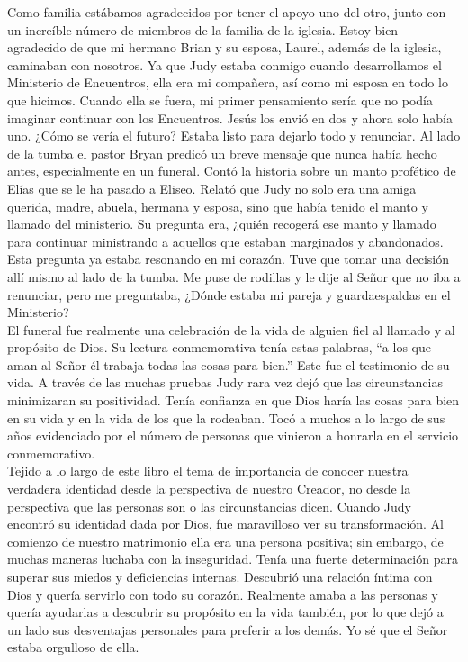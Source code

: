 \documentclass[twoside, 12pt]{book}
\begin{document}
Como familia estábamos agradecidos por tener el apoyo uno del otro, junto con un increíble número de miembros de la familia de la iglesia. Estoy bien agradecido de que mi hermano Brian y su esposa, Laurel, además de la iglesia, caminaban con nosotros. Ya que Judy estaba conmigo cuando desarrollamos el Ministerio de Encuentros, ella era mi compañera, así como mi esposa en todo lo que hicimos. Cuando ella se fuera, mi primer pensamiento sería que no podía imaginar continuar con los Encuentros. Jesús los envió en dos y ahora solo había uno. ¿Cómo se vería el futuro? Estaba listo para dejarlo todo y renunciar. Al lado de la tumba el pastor Bryan predicó un breve mensaje que nunca había hecho antes, especialmente en un funeral. Contó la historia sobre un manto profético de Elías que se le ha pasado a Eliseo. Relató que Judy no solo era una amiga querida, madre, abuela, hermana y esposa, sino que había tenido el manto y llamado del ministerio. Su pregunta era, ¿quién recogerá ese manto y llamado para continuar ministrando a aquellos que estaban marginados y abandonados. Esta pregunta ya estaba resonando en mi corazón. Tuve que tomar una decisión allí mismo al lado de la tumba. Me puse de rodillas y le dije al Señor que no iba a renunciar, pero me preguntaba, ¿Dónde estaba mi pareja y guardaespaldas en el Ministerio?\\
 
El funeral fue realmente una celebración de la vida de alguien fiel al llamado y al propósito de Dios. Su lectura conmemorativa tenía estas palabras, “a los que aman al Señor él trabaja todas las cosas para bien.” Este fue el testimonio de su vida. A través de las muchas pruebas Judy rara vez dejó que las circunstancias minimizaran su positividad. Tenía confianza en que Dios haría las cosas para bien en su vida y en la vida de los que la rodeaban. Tocó a muchos a lo largo de sus años evidenciado por el número de personas que vinieron a honrarla en el servicio conmemorativo.\\
 
Tejido a lo largo de este libro el tema de importancia de conocer nuestra verdadera identidad desde la perspectiva de nuestro Creador, no desde la perspectiva que las personas son o las circunstancias dicen. Cuando Judy encontró su identidad dada por Dios, fue maravilloso ver su transformación. Al comienzo de nuestro matrimonio ella era una persona positiva; sin embargo, de muchas maneras luchaba con la inseguridad. Tenía una fuerte determinación para superar sus miedos y deficiencias internas. Descubrió una relación íntima con Dios y quería servirlo con todo su corazón. Realmente amaba a las personas y quería ayudarlas a descubrir su propósito en la vida también, por lo que dejó a un lado sus desventajas personales para preferir a los demás. Yo sé que el Señor estaba orgulloso de ella.\\
\end{document}
